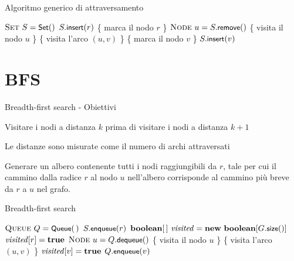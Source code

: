 \begin{frame}{Algoritmo generico di attraversamento}
	
\begin{Procedure}
\caption[A]{($\Graph\ G, \Node\ r$)}

$\textsc{Set}\ S = \textsf{{\small Set}}()$
$S.\textsf{{\small insert}}(r)$
\{ \alert{marca il nodo $r$} \} \;
{
  $\textsc{Node}\ u = S.\textsf{{\small remove}}()$
  \{ \alert{visita il nodo $u$} \}\;
  {
    \{ \alert{visita l'arco $(u,v)$} \}\;
    {
      \{ \alert{marca il nodo $v$} \} \;
      $S.\textsf{{\small insert}}(v)$
    }
  }
}
\end{Procedure}

\end{frame}

\section{BFS}

\begin{frame}{Breadth-first search - Obiettivi}

\BI
\item Visitare i nodi a distanza $k$ prima di visitare i nodi a distanza $k+1$ 
\EI

\medskip
{}
\BI
\item Le distanze sono misurate come il numero di archi attraversati
\EI

\medskip
{}
\BI
\item Generare un albero contenente tutti i nodi raggiungibili da $r$, tale per cui il cammino dalla radice $r$ al nodo $u$ nell'albero corrisponde al cammino più breve da $r$ a $u$ nel grafo.
\EI


\end{frame}

\begin{frame}[shrink=10]{Breadth-first search}

\vspace{-12pt}
\begin{Procedure}
\caption[A]{\bfsproc($\Graph\ G, \Node\ r$)}

$\textsc{Queue}\ Q = \textsf{{\small Queue}}(\,)$\;
$S.\textsf{{\small enqueue}}(r)$\;
$\BOOLEAN[\,]\ \mmark = \NEW\ \BOOLEAN[G.\fontproc{size}()]$\;
$\mmark[r] = \TRUE$\;
{
  $\textsc{Node}\ u = Q.\textsf{{\small dequeue}}()$\;
  \{ \alert{visita il nodo $u$ }\}\;
  {
    \{ \alert{visita l'arco $(u,v)$} \}\;
    \If{\NOT $\mmark[v]$}
    {
      { $\mmark[v] = \TRUE$ } \;
      $Q.\textsf{{\small enqueue}}(v)$\;
    }
  }
}
\end{Procedure}

\end{frame}

